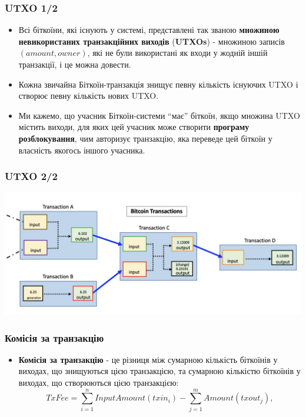 \documentclass{beamer}
\begin{document}
\begin{frame}
  \frametitle{UTXO 1/2}
  \begin{itemize}
  \item Всі біткоїни, які існують у системі, представлені так званою
    \textbf{множиною невикористаних транзакційних виходів} (\textbf{UTXOs}) -
    множиною записів $(amount, owner)$, які не були використані як входи у
    жодній іншій транзакції, і це можна довести.
  \item Кожна звичайна Біткоїн-транзакція знищує певну кількість існуючих UTXO і
    створює певну кількість нових UTXO.
  \item Ми кажемо, що учасник Біткоїн-системи ``має'' біткоїн, якщо множина UTXO
    містить виходи, для яких цей учасник може створити \textbf{програму
      розблокування}, чим авторизує транзакцію, яка переведе цей біткоїн у
    власність якогось іншого учасника.
  \end{itemize}
\end{frame}

\begin{frame}
  \frametitle{UTXO 2/2}
  \begin{center}
    \includegraphics[width=\textwidth]{tx}
  \end{center}
\end{frame}

\begin{frame}[fragile]
  \frametitle{Комісія за транзакцію}
  \begin{itemize}
  \item \textbf{Комісія за транзакцію} - це різниця між сумарною кількість
    біткоїнів у виходах, що знищуються цією транзакцією, та сумарною кількістю
    біткоїнів у виходах, що створюються цією транзакцією:
    $$TxFee = \sum_{i=1}^n InputAmount(txin_i) - \sum_{j=1}^m Amount(txout_j),$$
  \end{itemize}
\end{frame}
\end{document}
